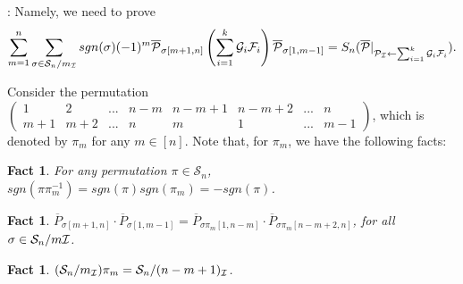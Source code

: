 \documentclass[12pt,reqno]{article}
\newtheorem{fact}[theorem]{Fact}
\newcommand{\cd}{\cdot}
\newenvironment{proof}{\QuadSpace\par\noindent{\bf Proof}:}{\EndProof\HalfSpace}
\newcommand{\QuadSpace}{\vspace{0.25\baselineskip}}
\newcommand{\HalfSpace}{\vspace{0.5\baselineskip}}
\newcommand{\EndProof}{ \hfill \vrule width 1ex height 1ex depth 0pt }
\renewcommand{\t}[1]{\overline{#1}}
\newcommand{\s}{\sigma}
\renewcommand{\S}{\mathcal{S}}
\newcommand\ii{{\cal I}}
\begin{document}
\begin{proof}
Namely, we need to prove 
$$\sum_{m=1}^{n} \sum_{\s\in \S_n/m_\ii}sgn(\s)(-1)^m \t{\mathcal P}_{\s[m+1,n]}\left(\sum_{i=1}^k\mathcal {G}_i \mathcal {F}_i\right) \t{\mathcal P}_{\s[1,m-1]} = S_{n}(\t{\mathcal P}|_{ \mathcal P _\ii\leftarrow 
	\sum_{i=1}^k\mathcal {G}_i \mathcal {F}_i}).$$

Consider the permutation $ \left(\begin{array}{cccccccc}
	1 &2 &...& n-m&n-m+1&n-m+2&...&n\\                                                                                                                                                                                                                                                                                                                                m+1 &m+2 & ...&n&m& 1 &...&m-1
	\end{array}\right) 
	$, which is denoted by $\pi_m$ for any $ m\in [n]$. 
Note that, for $\pi_m$, we have the following facts:

\begin{fact}\label{fac:sign}
  For any permutation $\pi\in \S_n$, $sgn(\pi\pi_m^{-1})=sgn(\pi)sgn(\pi_m)=-sgn(\pi)$.
\end{fact}
\begin{fact}\label{fac:perm-transfer}
  $ \t{P}_{\s[m+1,n]}\cd \t{P}_{\s[1,m-1]}=\t{P}_{\s\pi_m[1,n-m]}\cd \t{P}_{\s\pi_m[n-m+2,n]}$, for all $\s\in \S_n/m\ii$.
\end{fact}

\begin{fact}\label{fac:set-transfer}
  $(\S_n/m_\ii)\pi_m= \S_n/(n-m+1)_\ii$.
\end{fact}



\end{proof}
\end{document}
